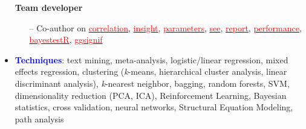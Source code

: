 \documentclass[10pt]{article}
\begin{document}
\begin{itemize}
\begin{itemize}
	\end{itemize}
	
	 \textbf{Team developer}
	 \vspace*{-0.09in}
	
	\begin{itemize}	 
		\item[--] Co-author on \href{https://easystats.github.io/correlation/}{\textcolor{red}{correlation}}, \href{https://easystats.github.io/insight/}{\textcolor{red}{insight}}, \href{https://easystats.github.io/parameters/}{\textcolor{red}{parameters}}, \href{https://easystats.github.io/see/}{\textcolor{red}{see}}, \href{https://easystats.github.io/report/}{\textcolor{red}{report}}, \href{https://easystats.github.io/performance/}{\textcolor{red}{performance}}, \href{https://easystats.github.io/bayestestR/}{\textcolor{red}{bayestestR}},  \href{https://const-ae.github.io/ggsignif/}{\textcolor{red}{ggsignif}}

	\end{itemize}

	\item \textcolor{blue}{\textbf{Techniques}}: text mining, meta-analysis, logistic/linear regression, mixed effects regression, clustering \hspace*{0.1in}(\textit{k}-means, hierarchical cluster analysis, linear discriminant analysis), \textit{k}-nearest neighbor, bagging, random \hspace*{0.1in}forests, SVM, dimensionality reduction (PCA, ICA), Reinforcement Learning, Bayesian statistics, cross \hspace*{0.1in}validation, neural networks, Structural Equation Modeling, path analysis
	
	
    
    \end{itemize}
	

	
\end{document}
